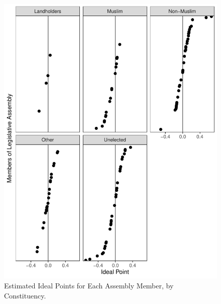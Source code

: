 \documentclass[12pt,letter]{article}
\begin{document}
\begin{figure}
    \centering
    \includegraphics[width=\linewidth]{../figs/pointplot.pdf}
    \caption{Estimated Ideal Points for Each Assembly Member, by Constituency.}
    \label{fig:ideal_points}
\end{figure}
\end{document}
